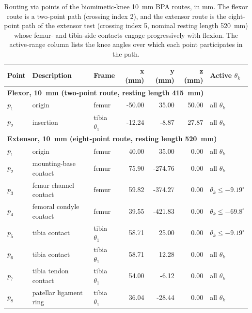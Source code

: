 \documentclass[utf8]{frontiers_suppmat} %
\begin{document}
\begin{table}[htbp]
\caption{Routing via points of the biomimetic-knee \qty{10}{\milli\metre} BPA routes, in mm. The flexor route is a two-point path (crossing index 2), and the extensor route is the eight-point path of the extensor test (crossing index 5, nominal resting length \qty{520}{\milli\metre}) whose femur- and tibia-side contacts engage progressively with flexion. The active-range column lists the knee angles over which each point participates in the path.}
\label{tab:RouteBio10}
\centering
\small
\begin{tabular}{lllrrrl}
\hline
\textbf{Point} & \textbf{Description} & \textbf{Frame} & \textbf{x (mm)} & \textbf{y (mm)} & \textbf{z (mm)} & \textbf{Active $\theta_{k}$} \\
\hline
\multicolumn{7}{l}{\textbf{Flexor, \qty{10}{\milli\metre} (two-point route, resting length \qty{415}{\milli\metre})}} \\
\hspace{3mm} $p_{1}$ & origin & femur & -50.00 & 35.00 & 50.00 & all $\theta_{k}$ \\
\hspace{3mm} $p_{2}$ & insertion & tibia $\theta_{1}$ & -12.24 & -8.87 & 27.87 & all $\theta_{k}$ \\
\multicolumn{7}{l}{\textbf{Extensor, \qty{10}{\milli\metre} (eight-point route, resting length \qty{520}{\milli\metre})}} \\
\hspace{3mm} $p_{1}$ & origin & femur & 40.00 & 35.00 & 0.00 & all $\theta_{k}$ \\
\hspace{3mm} $p_{2}$ & mounting-base contact & femur & 75.90 & -274.76 & 0.00 & all $\theta_{k}$ \\
\hspace{3mm} $p_{3}$ & femur channel contact & femur & 59.82 & -374.27 & 0.00 & $\theta_{k} \leq -9.19^{\circ}$ \\
\hspace{3mm} $p_{4}$ & femoral condyle contact & femur & 39.55 & -421.83 & 0.00 & $\theta_{k} \leq -69.8^{\circ}$ \\
\hspace{3mm} $p_{5}$ & tibia contact & tibia $\theta_{1}$ & 58.71 & 25.00 & 0.00 & $\theta_{k} \leq -9.19^{\circ}$ \\
\hspace{3mm} $p_{6}$ & tibia contact & tibia $\theta_{1}$ & 58.71 & 12.28 & 0.00 & all $\theta_{k}$ \\
\hspace{3mm} $p_{7}$ & tibia tendon contact & tibia $\theta_{1}$ & 54.00 & -6.12 & 0.00 & all $\theta_{k}$ \\
\hspace{3mm} $p_{8}$ & patellar ligament ring & tibia $\theta_{1}$ & 36.04 & -28.44 & 0.00 & all $\theta_{k}$ \\
\hline
\end{tabular}
\end{table}
\end{document}
